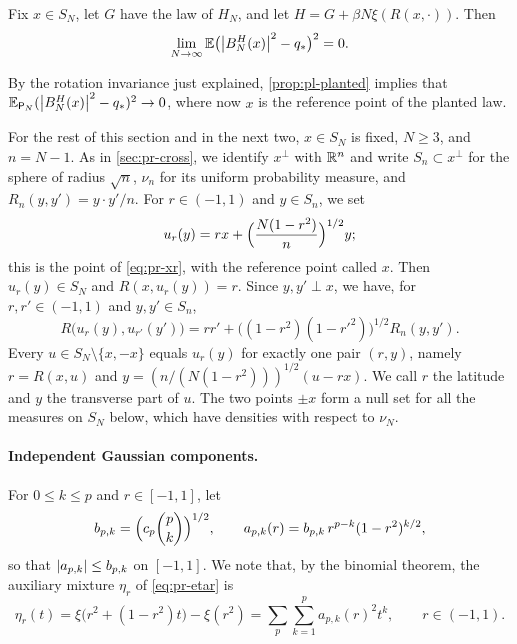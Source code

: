 \begin{proposition}\label{prop:pl-planted}
Fix $x\in S_N$, let $G$ have the law of $H_N$, and let $H=G+\beta N\xi(R(x,\cdot))$. Then
\[
\lim_{N\to\infty}\mathbb E\bigl(\left|B^H_N(x)\right|^2-q_*\bigr)^2=0 .
\]
\end{proposition}

By the rotation invariance just explained, \cref{prop:pl-planted} implies that $\mathbb E_{\mathsf P_N}(\left|B_N^H(x)\right|^2-q_*)^2\to0$, where now $x$ is the reference point of the planted law.

For the rest of this section and in the next two, $x\in S_N$ is fixed, $N\ge3$, and $n=N-1$. As in \cref{sec:pr-cross}, we identify $x^\perp$ with $\mathbb R^n$ and write $S_n\subset x^\perp$ for the sphere of radius $\sqrt n$, $\nu_n$ for its uniform probability measure, and $R_n(y,y')=y\cdot y'/n$. For $r\in(-1,1)$ and $y\in S_n$, we set
\begin{equation}\label{eq:pl-section}
u_r(y)=rx+\Bigl(\frac{N(1-r^2)}n\Bigr)^{1/2}y ;
\end{equation}
this is the point of \eqref{eq:pr-xr}, with the reference point called $x$. Then $u_r(y)\in S_N$ and $R(x,u_r(y))=r$. Since $y,y'\perp x$, we have, for $r,r'\in(-1,1)$ and $y,y'\in S_n$,
\begin{equation}\label{eq:pl-overlap}
R\bigl(u_r(y),u_{r'}(y')\bigr)=rr'+\bigl((1-r^2)(1-r'^2)\bigr)^{1/2}R_n(y,y').
\end{equation}
Every $u\in S_N\setminus\{x,-x\}$ equals $u_r(y)$ for exactly one pair $(r,y)$, namely $r=R(x,u)$ and $y=(n/(N(1-r^2)))^{1/2}(u-rx)$. We call $r$ the latitude and $y$ the transverse part of $u$. The two points $\pm x$ form a null set for all the measures on $S_N$ below, which have densities with respect to $\nu_N$.

\paragraph{Independent Gaussian components.}
For $0\le k\le p$ and $r\in[-1,1]$, let
\[
b_{p,k}=\Bigl(c_p\binom pk\Bigr)^{1/2},\qquad a_{p,k}(r)=b_{p,k}\,r^{p-k}(1-r^2)^{k/2},
\]
so that $\left|a_{p,k}\right|\le b_{p,k}$ on $[-1,1]$.
We note that, by the binomial theorem, the auxiliary mixture $\eta_r$ of \eqref{eq:pr-etar} is
\begin{equation}\label{eq:pl-etar-coef}
\eta_r(t)=\xi\bigl(r^2+(1-r^2)t\bigr)-\xi(r^2)=\sum_p\sum_{k=1}^pa_{p,k}(r)^2t^k,\qquad r\in(-1,1).
\end{equation}

